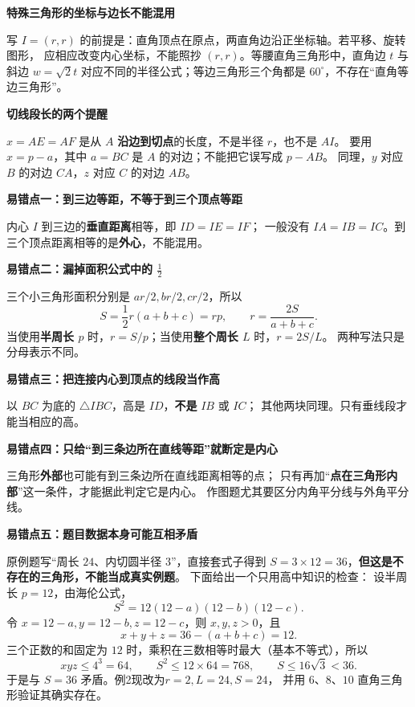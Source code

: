 \begin{trapbox}
\textbf{\textcolor{CTrap}{特殊三角形的坐标与边长不能混用}}

写 $I=(r,r)$ 的前提是：直角顶点在原点，两直角边沿正坐标轴。若平移、旋转图形，
应相应改变内心坐标，不能照抄 $(r,r)$。等腰直角三角形中，直角边 $t$ 与斜边 $w=\sqrt2t$
对应不同的半径公式；等边三角形三个角都是 $60^\circ$，不存在“直角等边三角形”。

\medskip
\textbf{\textcolor{CTrap}{切线段长的两个提醒}}

$x=AE=AF$ 是从 $A$ \textbf{沿边到切点}的长度，不是半径 $r$，也不是 $AI$。
要用 $x=p-a$，其中 $a=BC$ 是 $A$ 的对边；不能把它误写成 $p-AB$。
同理，$y$ 对应 $B$ 的对边 $CA$，$z$ 对应 $C$ 的对边 $AB$。

\medskip
\textbf{\textcolor{CTrap}{易错点一：到三边等距，不等于到三个顶点等距}}

内心 $I$ 到三边的\textbf{垂直距离}相等，即 $ID=IE=IF$；
一般没有 $IA=IB=IC$。到三个顶点距离相等的是\textbf{外心}，不能混用。

\medskip
\textbf{\textcolor{CTrap}{易错点二：漏掉面积公式中的 $\frac12$}}

三个小三角形面积分别是 $ar/2,br/2,cr/2$，所以
\[
 S=\frac12r(a+b+c)=rp,\qquad r=\frac{2S}{a+b+c}.
\]
当使用\textbf{半周长 $p$} 时，$r=S/p$；当使用\textbf{整个周长 $L$} 时，$r=2S/L$。
两种写法只是分母表示不同。

\medskip
\textbf{\textcolor{CTrap}{易错点三：把连接内心到顶点的线段当作高}}

以 $BC$ 为底的 $\triangle IBC$，高是 $ID$，\textbf{不是} $IB$ 或 $IC$；
其他两块同理。只有垂线段才能当相应的高。

\medskip
\textbf{\textcolor{CTrap}{易错点四：只给“到三条边所在直线等距”就断定是内心}}


三角形\textbf{外部}也可能有到三条边所在直线距离相等的点；
只有再加“\textbf{点在三角形内部}”这一条件，才能据此判定它是内心。
作图题尤其要区分内角平分线与外角平分线。

\medskip
\textbf{\textcolor{CTrap}{易错点五：题目数据本身可能互相矛盾}}

原例题写“周长 $24$、内切圆半径 $3$”，直接套式子得到
$S=3\times12=36$，\textbf{但这是不存在的三角形，不能当成真实例题}。
下面给出一个只用高中知识的检查：
设半周长 $p=12$，由海伦公式，
\[
 S^2=12(12-a)(12-b)(12-c).
\]
令 $x=12-a,y=12-b,z=12-c$，则 $x,y,z>0$，且
\[
 x+y+z=36-(a+b+c)=12.
\]
三个正数的和固定为 $12$ 时，乘积在三数相等时最大（基本不等式），所以
\[
 xyz\le4^3=64,\qquad S^2\le12\times64=768,
 \qquad S\le16\sqrt3<36.
\]
于是与 $S=36$ 矛盾。例2现改为\textbf{$r=2,L=24,S=24$}，
并用 $6$、$8$、$10$ 直角三角形验证其确实存在。


\end{trapbox}
